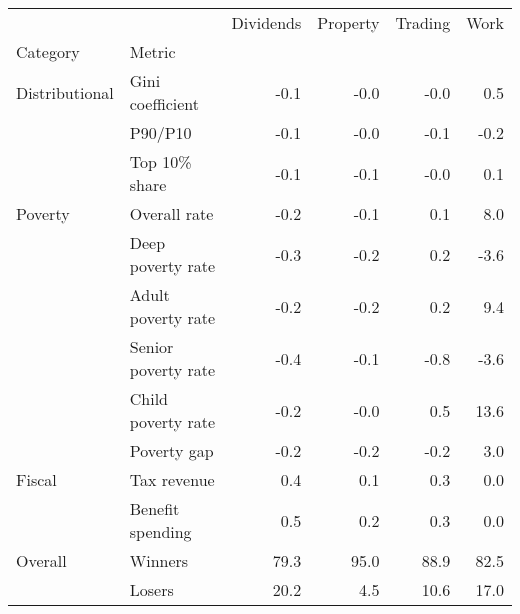 \begin{tabular}{llrrrr}
\toprule
        &        &  Dividends &  Property &  Trading &  Work \\
Category & Metric &            &           &          &       \\
\midrule
Distributional & Gini coefficient &       -0.1 &      -0.0 &     -0.0 &   0.5 \\
        & P90/P10 &       -0.1 &      -0.0 &     -0.1 &  -0.2 \\
        & Top 10\% share &       -0.1 &      -0.1 &     -0.0 &   0.1 \\
Poverty & Overall rate &       -0.2 &      -0.1 &      0.1 &   8.0 \\
        & Deep poverty rate &       -0.3 &      -0.2 &      0.2 &  -3.6 \\
        & Adult poverty rate &       -0.2 &      -0.2 &      0.2 &   9.4 \\
        & Senior poverty rate &       -0.4 &      -0.1 &     -0.8 &  -3.6 \\
        & Child poverty rate &       -0.2 &      -0.0 &      0.5 &  13.6 \\
        & Poverty gap &       -0.2 &      -0.2 &     -0.2 &   3.0 \\
Fiscal & Tax revenue &        0.4 &       0.1 &      0.3 &   0.0 \\
        & Benefit spending &        0.5 &       0.2 &      0.3 &   0.0 \\
Overall & Winners &       79.3 &      95.0 &     88.9 &  82.5 \\
        & Losers &       20.2 &       4.5 &     10.6 &  17.0 \\
\bottomrule
\end{tabular}
